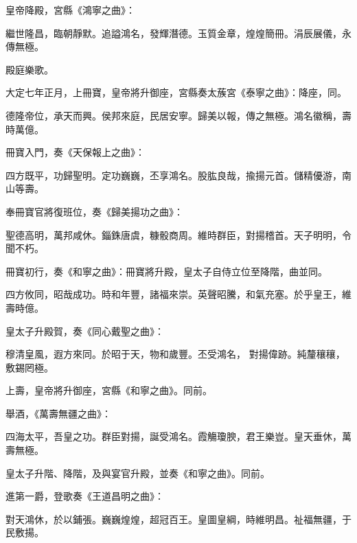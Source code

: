\begin{pinyinscope}
 皇帝降殿，宮縣《鴻寧之曲》：



 繼世隆昌，臨朝靜默。追謚鴻名，發輝潛德。玉質金章，煌煌簡冊。涓辰展儀，永傳無極。



 殿庭樂歌。



 大定七年正月，上冊寶，皇帝將升御座，宮縣奏太蔟宮《泰寧之曲》：降座，同。



 德隆帝位，承天而興。侯邦來庭，民居安寧。歸美以報，傳之無極。鴻名徽稱，壽時萬億。



 冊寶入門，奏《天保報上之曲》：



 四方既平，功歸聖明。定功巍巍，丕享鴻名。股肱良哉，揄揚元首。儲精優游，南山等壽。



 奉冊寶官將復班位，奏《歸美揚功之曲》：



 聖德高明，萬邦咸休。錙銖唐虞，糠骰商周。維時群臣，對揚稽首。天子明明，令聞不朽。



 冊寶初行，奏《和寧之曲》：冊寶將升殿，皇太子自侍立位至降階，曲並同。



 四方攸同，昭哉成功。時和年豐，諸福來崇。英聲昭騰，和氣充塞。於乎皇王，維壽時億。



 皇太子升殿賀，奏《同心戴聖之曲》：



 穆清皇風，遐方來同。於昭于天，物和歲豐。丕受鴻名，
 對揚偉跡。純釐穰穰，敷錫罔極。



 上壽，皇帝將升御座，宮縣《和寧之曲》。同前。



 舉酒，《萬壽無疆之曲》：



 四海太平，吾皇之功。群臣對揚，誕受鴻名。霞觴瓊腴，君王樂豈。皇天垂休，萬壽無極。



 皇太子升階、降階，及與宴官升殿，並奏《和寧之曲》。同前。



 進第一爵，登歌奏《王道昌明之曲》：



 對天鴻休，於以鋪張。巍巍煌煌，超冠百王。皇圖皇綱，時維明昌。祉福無疆，于民敷揚。




\end{pinyinscope}
